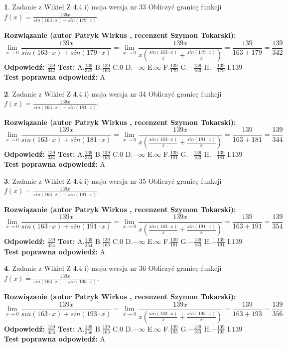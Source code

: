 \documentclass[12pt, a4paper]{article}
\theoremstyle{definition} %
\newtheorem{zad}{}
\newcommand{\zadStart}[1]{\begin{zad}#1\newline}
\newcommand{\zadStop}{\end{zad}}
\newcommand{\rozwStart}[2]{\noindent \textbf{Rozwiązanie (autor #1 , recenzent #2): }\newline}
\newcommand{\rozwStop}{\newline}
\newcommand{\odpStart}{\noindent \textbf{Odpowiedź:}\newline}
\newcommand{\odpStop}{\newline}
\newcommand{\testStart}{\noindent \textbf{Test:}\newline}
\newcommand{\testStop}{\newline}
\newcommand{\kluczStart}{\noindent \textbf{Test poprawna odpowiedź:}\newline}
\newcommand{\kluczStop}{\newline}
\begin{document}
\zadStart{Zadanie z Wikieł Z 4.4 i) moja wersja nr 33}
Obliczyć granicę funkcji $f(x)=\frac{139x}{sin(163\cdot x) +sin(179\cdot x)}$.
\zadStop
\rozwStart{Patryk Wirkus}{Szymon Tokarski}
$$\lim\limits_{x\to 0}\frac{139x}{sin(163\cdot x) +sin(179\cdot x)}=\lim\limits_{x\to 0}\frac{139x}{x(\frac{sin(163\cdot x)}{x}+\frac{sin(179\cdot x)}{x})}=\frac{139}{163+179} = \frac{139}{342}$$
\rozwStop
\odpStart
$\frac{139}{342}$
\odpStop
\testStart
A.$\frac{139}{342}$
B.$\frac{139}{163}$
C.$0$
D.$-\infty$
E.$\infty$
F.$\frac{139}{179}$
G.$-\frac{139}{163}$
H.$-\frac{139}{179}$
I.$139$
\testStop
\kluczStart
A
\kluczStop



\zadStart{Zadanie z Wikieł Z 4.4 i) moja wersja nr 34}
Obliczyć granicę funkcji $f(x)=\frac{139x}{sin(163\cdot x) +sin(181\cdot x)}$.
\zadStop
\rozwStart{Patryk Wirkus}{Szymon Tokarski}
$$\lim\limits_{x\to 0}\frac{139x}{sin(163\cdot x) +sin(181\cdot x)}=\lim\limits_{x\to 0}\frac{139x}{x(\frac{sin(163\cdot x)}{x}+\frac{sin(181\cdot x)}{x})}=\frac{139}{163+181} = \frac{139}{344}$$
\rozwStop
\odpStart
$\frac{139}{344}$
\odpStop
\testStart
A.$\frac{139}{344}$
B.$\frac{139}{163}$
C.$0$
D.$-\infty$
E.$\infty$
F.$\frac{139}{181}$
G.$-\frac{139}{163}$
H.$-\frac{139}{181}$
I.$139$
\testStop
\kluczStart
A
\kluczStop



\zadStart{Zadanie z Wikieł Z 4.4 i) moja wersja nr 35}
Obliczyć granicę funkcji $f(x)=\frac{139x}{sin(163\cdot x) +sin(191\cdot x)}$.
\zadStop
\rozwStart{Patryk Wirkus}{Szymon Tokarski}
$$\lim\limits_{x\to 0}\frac{139x}{sin(163\cdot x) +sin(191\cdot x)}=\lim\limits_{x\to 0}\frac{139x}{x(\frac{sin(163\cdot x)}{x}+\frac{sin(191\cdot x)}{x})}=\frac{139}{163+191} = \frac{139}{354}$$
\rozwStop
\odpStart
$\frac{139}{354}$
\odpStop
\testStart
A.$\frac{139}{354}$
B.$\frac{139}{163}$
C.$0$
D.$-\infty$
E.$\infty$
F.$\frac{139}{191}$
G.$-\frac{139}{163}$
H.$-\frac{139}{191}$
I.$139$
\testStop
\kluczStart
A
\kluczStop



\zadStart{Zadanie z Wikieł Z 4.4 i) moja wersja nr 36}
Obliczyć granicę funkcji $f(x)=\frac{139x}{sin(163\cdot x) +sin(193\cdot x)}$.
\zadStop
\rozwStart{Patryk Wirkus}{Szymon Tokarski}
$$\lim\limits_{x\to 0}\frac{139x}{sin(163\cdot x) +sin(193\cdot x)}=\lim\limits_{x\to 0}\frac{139x}{x(\frac{sin(163\cdot x)}{x}+\frac{sin(193\cdot x)}{x})}=\frac{139}{163+193} = \frac{139}{356}$$
\rozwStop
\odpStart
$\frac{139}{356}$
\odpStop
\testStart
A.$\frac{139}{356}$
B.$\frac{139}{163}$
C.$0$
D.$-\infty$
E.$\infty$
F.$\frac{139}{193}$
G.$-\frac{139}{163}$
H.$-\frac{139}{193}$
I.$139$
\testStop
\kluczStart
A
\kluczStop
\end{document}
